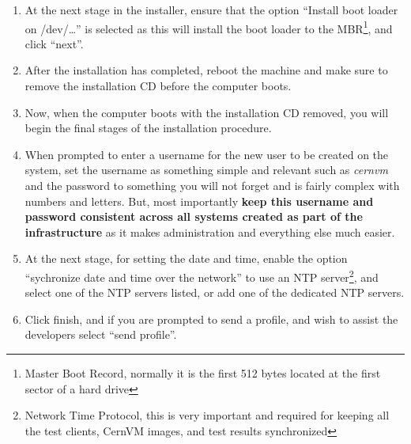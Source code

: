 \begin{enumerate}
\item	At the next stage in the installer, ensure that the option ``Install boot loader on /dev/\ldots'' is selected as this will install
		the boot loader to the MBR\footnote{Master Boot Record, normally it is the first 512 bytes located at the first sector of a hard 
		drive}, and click ``next''.
		
\item	After the installation has completed, reboot the machine and make sure to remove the installation CD before the computer boots.

\item	Now, when the computer boots with the installation CD removed, you will begin the final stages of the installation procedure.
		
\item	When prompted to enter a username for the new user to be created on the system, set the username as something simple and relevant
		such as \emph{cernvm} and the password to something you will not forget and is fairly complex with numbers and letters. But, most 
		importantly {\bf keep this username and password consistent across all systems created as part of the infrastructure} as it makes 
		administration and everything else much easier.
		
\item	At the next stage, for setting the date and time, enable the option ``sychronize date and time over the network'' to use an NTP
		server\footnote{Network Time Protocol, this is very important and required for keeping all the test clients, CernVM images,
		and test results synchronized}, and select one of the NTP servers listed, or add one of the \cern dedicated NTP servers.
		
\item	Click finish, and if you are prompted to send a profile, and wish to assist the developers select ``send profile''.
\end{enumerate}


\newpage
